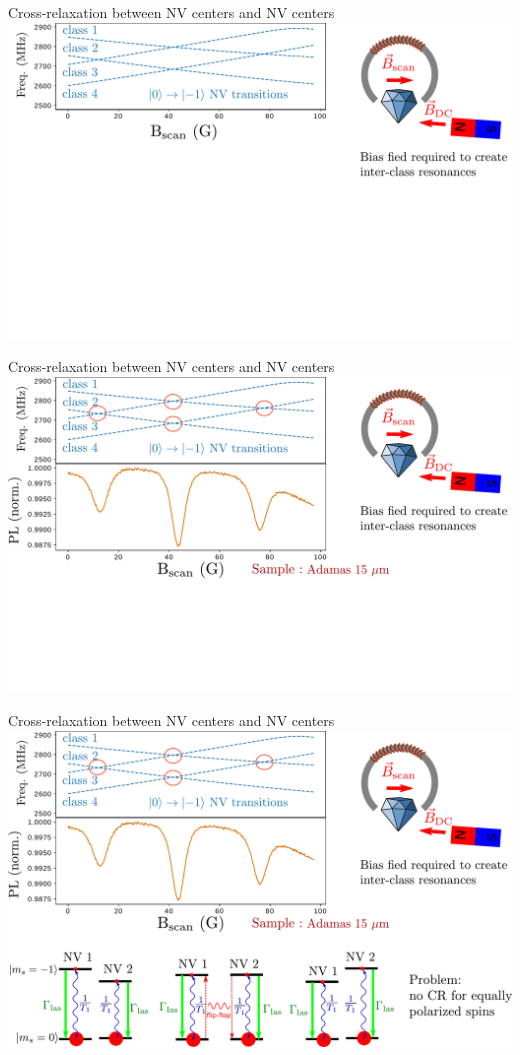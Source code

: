 \documentclass{beamer}
\begin{document}
\begin{frame}{Cross-relaxation between NV centers and NV centers}
\centering
\includegraphics[width=\textwidth,height=0.85\textheight,keepaspectratio]{Slide_CR_adamas_f-2}
\end{frame}

\begin{frame}{Cross-relaxation between NV centers and NV centers}
\centering
\includegraphics[width=\textwidth,height=0.85\textheight,keepaspectratio]{Slide_CR_adamas_f-1}
\end{frame}

\begin{frame}{Cross-relaxation between NV centers and NV centers}
\centering
\includegraphics[width=\textwidth,height=0.85\textheight,keepaspectratio]{Slide_CR_adamas_f}
\end{frame}
\end{document}
